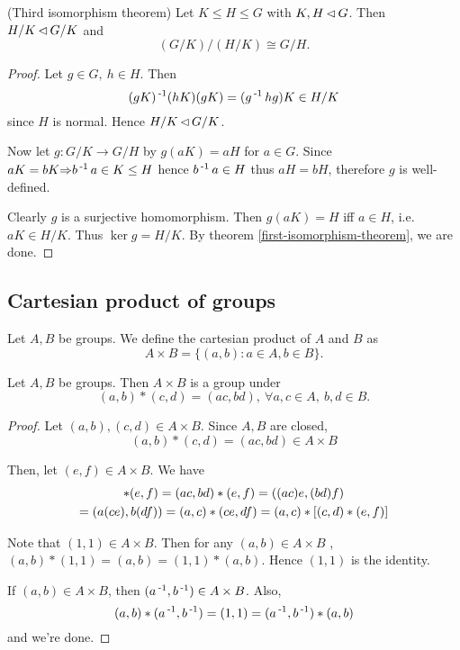 \documentclass[12pt]{article}
\begin{document}
	\begin{theorem}\label{third-isomorphism-theorem}
		(Third isomorphism theorem) Let $K\leq H\leq G$ with $K,H\operatorname{\vartriangleleft} G$. Then $H/K \operatorname{\vartriangleleft} G/K$ and 
		$$(G/K)/(H/K) \cong G/H.$$
	\end{theorem}

	\begin{proof}
		Let $g\in G,\ h\in H$. Then
		$$(gK)\operatorname{^{-1}} (hK) (gK) = (g\operatorname{^{-1}} h g)K \in H/K$$
		since $H$ is normal. Hence $H/K \operatorname{\vartriangleleft} G/K$.

		Now let $g: G/K \to G/H$ by $g(aK) = aH$ for $a\in G$. Since $aK=bK {\Rightarrow} b\operatorname{^{-1}} a \in K \leq H$ hence $b\operatorname{^{-1}} a\in H$ thus $aH=bH$, therefore $g$ is well-defined.

		Clearly $g$ is a surjective homomorphism. Then $g(aK) = H$ iff $a\in H$, i.e. $aK \in H/K$. Thus $\ker g = H/K$. By theorem \ref{first-isomorphism-theorem}, we are done.
	\end{proof}

\subsection{Cartesian product of groups}
	\begin{define}
		Let $A,B$ be groups. We define the cartesian product of $A$ and $B$ as
		\begin{equation*}
			A\times B = \{(a,b) : a\in A, b\in B\}.
		\end{equation*}
	\end{define}

	\begin{theorem}
		Let $A,B$ be groups. Then $A\times B$ is a group under
		$$(a,b)*(c,d) = (ac,bd),\ \forall a,c\in A,\ b,d\in B.$$
	\end{theorem}
	\begin{proof}
		Let $(a,b),(c,d)\in A\times B$. Since $A,B$ are closed, 
		$$(a,b)*(c,d) = (ac,bd) \in A\times B$$

		Then, let $(e,f) \in A\times B$. We have
		\begin{multline*}
		[(a,b)*(c,d)]*(e,f) = (ac,bd)*(e,f) = ((ac)e, (bd)f)\\ 
		= (a(ce),b(df)) = (a,c) * (ce,df) = (a,c) * [(c,d) * (e,f)]$$
		\end{multline*}
		
		Note that $(1,1)\in A\times B$. Then for any $(a,b) \in A\times B$
		, $(a,b)*(1,1) = (a,b) = (1,1) * (a,b)$. Hence $(1,1)$ is the identity.

		If $(a,b)\in A\times B$, then $(a\operatorname{^{-1}},b\operatorname{^{-1}}) \in A\times B$. Also,
		$$(a,b)*(a\operatorname{^{-1}},b\operatorname{^{-1}}) = (1,1) = (a\operatorname{^{-1}},b\operatorname{^{-1}}) * (a,b)$$
		and we're done.
	\end{proof}
\end{document}
